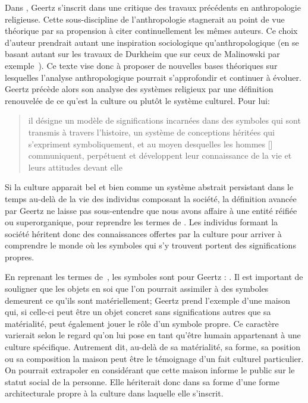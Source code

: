 Dans , Geertz s'inscrit dans une critique des travaux précédents en anthropologie religieuse. 
Cette sous-discipline de l'anthropologie stagnerait au point de vue théorique par sa propension à citer continuellement les mêmes auteurs. 
Ce choix d'auteur prendrait autant une inspiration sociologique qu'anthropologique (en se basant autant sur les travaux de Durkheim que sur ceux de Malinowski par exemple~\citep[20]{Geertz1972}). 
Ce texte vise donc à proposer de nouvelles bases théoriques sur lesquelles l'analyse anthropologique pourrait s'approfondir et continuer à évoluer. 
Geertz précède alors son analyse des systèmes religieux par une définition renouvelée de ce qu'est la culture ou plutôt le système culturel. 
Pour lui: \blockquote[{\cite[21]{Geertz1972}}][.]{\textelp{} il désigne un modèle de significations incarnées dans des symboles qui sont transmis à travers l'histoire, un système de conceptions héritées qui s'expriment symboliquement, et au moyen desquelles les hommes [] communiquent, perpétuent et développent leur connaissance de la vie et leurs attitudes devant elle}.

Si la culture apparait bel et bien comme un système abstrait persistant dans le temps au-delà de la vie des individus composant la société, la définition avancée par Geertz ne laisse pas sous-entendre que nous avons affaire à une entité réifiée ou superorganique, pour reprendre les termes de \citet{Duncan1980}. 
Les individus formant la société héritent donc des connaissances offertes par la culture pour arriver à comprendre le monde où les symboles qui s'y trouvent portent des significations propres.

En reprenant les termes de~\cite{Langer1962}, les symboles sont pour Geertz : . 
Il est important de souligner que les objets en soi que l'on pourrait assimiler à des symboles demeurent ce qu'ils sont matériellement; Geertz prend l'exemple d'une maison qui, si celle-ci peut être un objet concret sans significations autres que sa matérialité, peut également jouer le rôle d'un symbole propre. 
Ce caractère varierait selon le regard qu'on lui pose en tant qu'être humain appartenant à une culture spécifique. 
Autrement dit, au-delà de sa matérialité, sa forme, sa position ou sa composition la maison peut être le témoignage d'un fait culturel particulier. 
On pourrait extrapoler en considérant que cette maison informe le public sur le statut social de la personne. 
 Elle hériterait donc dans sa forme d'une forme architecturale propre à la culture dans laquelle elle s'inscrit.

